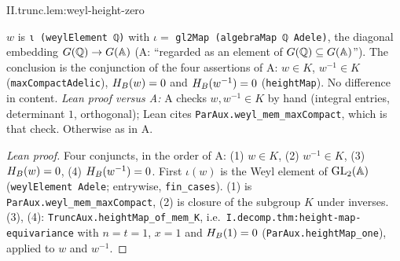 \begin{lemma}
\end{lemma}
\begin{tfformal}{II.trunc.lem:weyl-height-zero}
\begin{tffidelity}
$w$ is \texttt{ι (weylElement ℚ)} with $\iota=$ \texttt{gl2Map (algebraMap ℚ Adele)}, the diagonal embedding $G(\mathbb{Q})\to G(\mathbb{A})$ (A: ``regarded as an element of $G(\mathbb{Q})\subseteq G(\mathbb{A})$''). The conclusion is the conjunction of the four assertions of A: $w\in K$, $w^{-1}\in K$ (\texttt{maxCompactAdelic}), $H_B(w)=0$ and $H_B(w^{-1})=0$ (\texttt{heightMap}). No difference in content. \emph{Lean proof versus A:} A checks $w,w^{-1}\in K$ by hand (integral entries, determinant $1$, orthogonal); Lean cites \texttt{ParAux.weyl\_mem\_maxCompact}, which is that check. Otherwise as in A.
\end{tffidelity}
\end{tfformal}
\begin{proof}[Lean proof]
Four conjuncts, in the order of A: (1) $w\in K$, (2) $w^{-1}\in K$, (3) $H_B(w)=0$, (4) $H_B(w^{-1})=0$. First $\iota(w)$ is the Weyl element of $\mathrm{GL}_2(\mathbb{A})$ (\texttt{weylElement Adele}; entrywise, \texttt{fin\_cases}). (1) is \texttt{ParAux.weyl\_mem\_maxCompact}, (2) is closure of the subgroup $K$ under inverses. (3), (4): \texttt{TruncAux.heightMap\_of\_mem\_K}, i.e.\ \texttt{I.decomp.thm:height-map-equivariance} with $n=t=1$, $x=1$ and $H_B(1)=0$ (\texttt{ParAux.heightMap\_one}), applied to $w$ and $w^{-1}$.
\end{proof}

